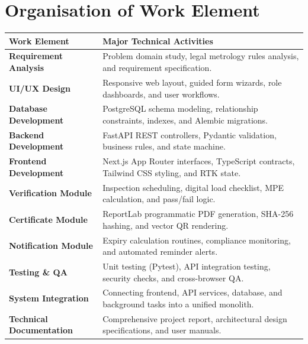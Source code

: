 \documentclass[11pt,a4paper]{article}
\begin{document}
\section{Organisation of Work Element}

\begin{table}[htbp]
\centering
\small
\renewcommand{\arraystretch}{1.2}
\begin{tabularx}{\textwidth}{|>{\columncolor{lightslate}}p{4.6cm}|X|}
\hline
\rowcolor{tablehead}
\textbf{\color{white}Work Element} & \textbf{\color{white}Major Technical Activities} \\ \hline
\textbf{Requirement Analysis} & Problem domain study, legal metrology rules analysis, and requirement specification. \\ \hline
\textbf{UI/UX Design} & Responsive web layout, guided form wizards, role dashboards, and user workflows. \\ \hline
\textbf{Database Development} & PostgreSQL schema modeling, relationship constraints, indexes, and Alembic migrations. \\ \hline
\textbf{Backend Development} & FastAPI REST controllers, Pydantic validation, business rules, and state machine. \\ \hline
\textbf{Frontend Development} & Next.js App Router interfaces, TypeScript contracts, Tailwind CSS styling, and RTK state. \\ \hline
\textbf{Verification Module} & Inspection scheduling, digital load checklist, MPE calculation, and pass/fail logic. \\ \hline
\textbf{Certificate Module} & ReportLab programmatic PDF generation, SHA-256 hashing, and vector QR rendering. \\ \hline
\textbf{Notification Module} & Expiry calculation routines, compliance monitoring, and automated reminder alerts. \\ \hline
\textbf{Testing \& QA} & Unit testing (Pytest), API integration testing, security checks, and cross-browser QA. \\ \hline
\textbf{System Integration} & Connecting frontend, API services, database, and background tasks into a unified monolith. \\ \hline
\textbf{Technical Documentation} & Comprehensive project report, architectural design specifications, and user manuals. \\ \hline
\end{tabularx}
\end{table}

\end{document}
